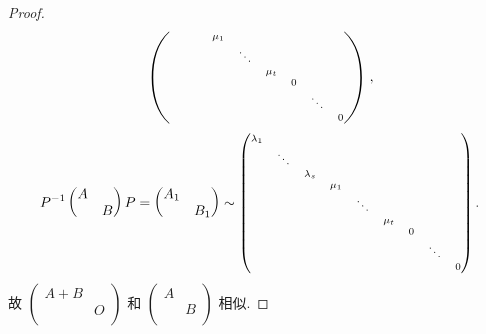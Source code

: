 \documentclass[../../main.tex]{subfiles}%
\begin{document}
\begin{proof}
\begin{align*}
\begin{scriptsize}
\begin{pmatrix}
&		&		&		\mu _1&		&		&		&		&		\\
&		&		&		&		\ddots&		&		&		&		\\
&		&		&		&		&		\mu _t&		&		&		\\
&		&		&		&		&		&		0&		&		\\
&		&		&		&		&		&		&		\ddots&		\\
&		&		&		&		&		&		&		&		0\\
\end{pmatrix}\end{scriptsize},
\end{align*}
\begin{align*}
P^{-1}\begin{pmatrix}
A&		\\
&		B\\
\end{pmatrix} P=\begin{pmatrix}
A_1&		\\
&		B_1\\
\end{pmatrix} \sim \begin{scriptsize}\begin{pmatrix}
\lambda _1&		&		&		&		&		&		&		&		\\
&		\ddots&		&		&		&		&		&		&		\\
&		&		\lambda _s&		&		&		&		&		&		\\
&		&		&		\mu _1&		&		&		&		&		\\
&		&		&		&		\ddots&		&		&		&		\\
&		&		&		&		&		\mu _t&		&		&		\\
&		&		&		&		&		&		0&		&		\\
&		&		&		&		&		&		&		\ddots&		\\
&		&		&		&		&		&		&		&		0\\
\end{pmatrix}\end{scriptsize}.
\end{align*}
故 $\begin{pmatrix}
A+B&		\\
&		O\\
\end{pmatrix}$ 和 $\begin{pmatrix}
A&		\\
&		B\\
\end{pmatrix}$ 相似.
\end{proof}
\end{document}
